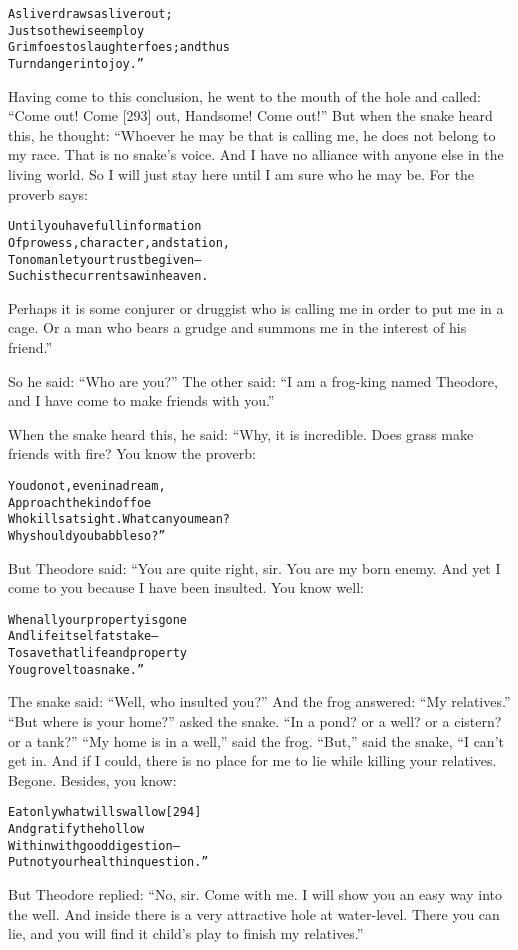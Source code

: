 \documentclass{article}
\renewenvironment{verbatim}{\begin{alltt}\normalfont\begin{centering}}{\end{centering}\end{alltt}}
\begin{document}
\begin{verbatim}
A sliver draws a sliver out;
    Just so the wise employ
Grim foes to slaughter foes; and thus
    Turn danger into joy.”
\end{verbatim}
Having come to this conclusion, he went to the mouth of the hole
and called: ``Come out! Come [293] out, Handsome! Come out!'' But
when the snake heard this, he thought: “Whoever he may be that is
calling me, he does not belong to my race. That is no snake's
voice. And I have no alliance with anyone else in the living world.
So I will just stay here until I am sure who he may be. For the
proverb says:

\begin{verbatim}
Until you have full information
Of prowess, character, and station,
To no man let your trust be given--
Such is the current saw in heaven.
\end{verbatim}
Perhaps it is some conjurer or druggist who is calling me in order
to put me in a cage. Or a man who bears a grudge and summons me in
the interest of his friend.”

So he said: ``Who are you?'' The other said:
``I am a frog-king named Theodore, and I have come to make friends with you.''

When the snake heard this, he said: “Why, it is incredible. Does
grass make friends with fire? You know the proverb:

\begin{verbatim}
You do not, even in a dream,
    Approach the kind of foe
Who kills at sight. What can you mean?
    Why should you babble so?”
\end{verbatim}
But Theodore said: “You are quite right, sir. You are my born
enemy. And yet I come to you because I have been insulted. You know
well:

\begin{verbatim}
When all your property is gone
    And life itself at stake--
To save that life and property
    You grovel to a snake.”
\end{verbatim}
The snake said: ``Well, who insulted you?'' And the frog answered:
``My relatives.'' ``But where is your home?'' asked the snake.
``In a pond? or a well? or a cistern? or a tank?''
``My home is in a well,'' said the frog. ``But,'' said the snake,
“I can't get in. And if I could, there is no place for me to lie
while killing your relatives. Begone. Besides, you know:

\begin{verbatim}
Eat only what will swallow                              [294]
And gratify the hollow
Within with good digestion--
Put not your health in question.”
\end{verbatim}
But Theodore replied:
``No, sir. Come with me. I will show you an easy way into the well. And inside there is a very attractive hole at water-level. There you can lie, and you will find it child's play to finish my relatives.''
\end{document}
